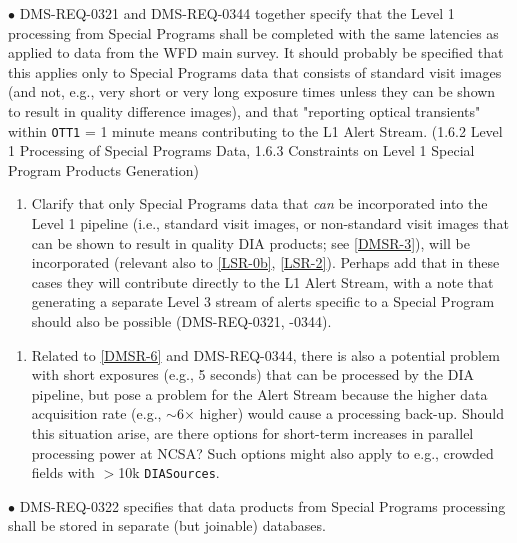 \documentclass[DM,lsstdraft,toc]{lsstdoc}
\begin{document}
$\bullet$ DMS-REQ-0321 and DMS-REQ-0344 together specify that the Level 1 processing from Special Programs shall be completed with the same latencies as applied to data from the WFD main survey. It should probably be specified that this applies only to Special Programs data that consists of standard visit images (and not, e.g., very short or very long exposure times unless they can be shown to result in quality difference images), and that "reporting optical transients" within {\tt OTT1} = 1 minute means contributing to the L1 Alert Stream. (1.6.2 Level 1 Processing of Special Programs Data, 1.6.3 Constraints on Level 1 Special Program Products Generation)
\begin{enumerate}[topsep=-10pt,after=\vspace{10pt},label= \textbf{Concern \Roman*.},resume] \item \label{DMSR-6} Clarify that only Special Programs data that {\it can} be incorporated into the Level 1 pipeline (i.e., standard visit images, or non-standard visit images that can be shown to result in quality DIA products; see \ref{DMSR-3}), will be incorporated (relevant also to \ref{LSR-0b}, \ref{LSR-2}). Perhaps add that in these cases they will contribute directly to the L1 Alert Stream, with a note that generating a separate Level 3 stream of alerts specific to a Special Program should also be possible (DMS-REQ-0321, -0344). \end{enumerate}

\begin{enumerate}[topsep=-10pt,after=\vspace{10pt},label= \textbf{Concern \Roman*.},resume] \item \label{DMSR-6b} Related to \ref{DMSR-6} and DMS-REQ-0344, there is also a potential problem with short exposures (e.g., 5 seconds) that can be processed by  the DIA pipeline, but pose a problem for the Alert Stream because the higher data acquisition rate (e.g., $\sim$6$\times$ higher) would cause a processing back-up. Should this situation arise, are there options for short-term increases in parallel processing power at NCSA? Such options might also apply to e.g., crowded fields with $>$10k {\tt DIASources}. \end{enumerate}

$\bullet$ DMS-REQ-0322 specifies that data products from Special Programs processing shall be stored in separate (but joinable) databases.
\end{document}
